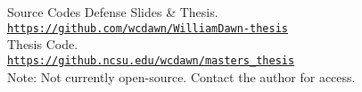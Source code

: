\documentclass[
  10pt,
  hyperref={pdfauthor={William C. Dawn},
  pdftitle={Fast Reactor with FEM Multiphysics},
  pdfcreator={pdftex},
  pdfsubject={NC State Defense},
  pdfkeywords={nuclear, sodium, fast, reactor, nuclear reactor, 
    finite element, multiphysics},}
]{beamer}
\begin{document}
\begin{frame}{Source Codes}
  Defense Slides \& Thesis.\\
  \texttt{\href{https://github.com/wcdawn/WilliamDawn-thesis}
    {https://github.com/wcdawn/WilliamDawn-thesis}}\\
  \vspace{0.5in}
  Thesis Code.\\
  \texttt{\href{https://github.ncsu.edu/wcdawn/masters_thesis}
    {https://github.ncsu.edu/wcdawn/masters\_thesis}}\\
  Note: Not currently open-source. Contact the author for access.
\end{frame}
\end{document}

